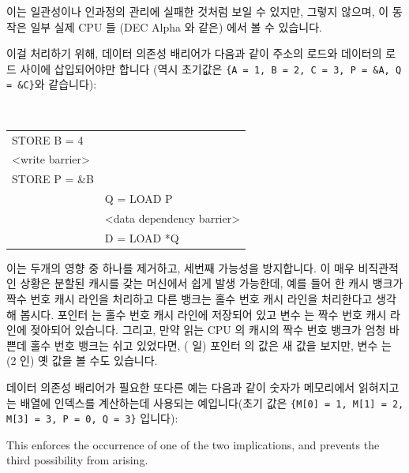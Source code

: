 \begin{enumerate}
이는 일관성이나 인과정의 관리에 실패한 것처럼 보일 수 있지만, 그렇지 않으며, 이
동작은 일부 실제 CPU 들 (DEC Alpha 와 같은) 에서 볼 수 있습니다.

이걸 처리하기 위해, 데이터 의존성 배리어가 다음과 같이 주소의 로드와 데이터의
로드 사이에 삽입되어야만 합니다 (역시 초기값은
{\tt \{A = 1, B = 2, C = 3, P = \&A, Q = \&C\}}와 같습니다):

\vspace{5pt}
\begin{minipage}[t]{\columnwidth}
\tt
\scriptsize
\begin{tabular}{l|p{1.5in}}
	\nf{CPU 1}	& \nf{CPU 2} \\
	\hline
	STORE B = 4	& \\
	<write barrier>	& \\
	STORE P = \&B	& \\
			& Q = LOAD P \\
			& <data dependency barrier> \\
			& D = LOAD *Q \\
\end{tabular}
\end{minipage}
\vspace{5pt}

이는 두개의 영향 중 하나를 제거하고, 세번째 가능성을 방지합니다.
이 매우 비직관적인 상황은 분할된 캐시를 갖는 머신에서 쉽게 발생 가능한데, 예를
들어 한 캐시 뱅크가 짝수 번호 캐시 라인을 처리하고 다른 뱅크는 홀수 번호 캐시
라인을 처리한다고 생각해 봅시다.
포인터  는 홀수 번호 캐시 라인에 저장되어 있고 변수  는 짝수 번호
캐시 라인에 젖아되어 있습니다.
그리고, 만약 읽는 CPU 의 캐시의 짝수 번호 뱅크가 엄청 바쁜데 홀수 번호 뱅크는
쉬고 있었다면, ( 일) 포인터  의 값은 새 값을 보지만, 변수 
는 (2 인) 옛 값을 볼 수도 있습니다.

데이터 의존성 배리어가 필요한 또다른 예는 다음과 같이 숫자가 메모리에서
읽혀지고는 배열에 인덱스를 계산하는데 사용되는 예입니다(초기 값은 {\tt \{M[0] =
1, M[1] = 2, M[3] = 3, P = 0, Q = 3\}} 입니다):
\iffalse

This enforces the occurrence of one of the two implications, and prevents the
third possibility from arising.


\end{enumerate}
